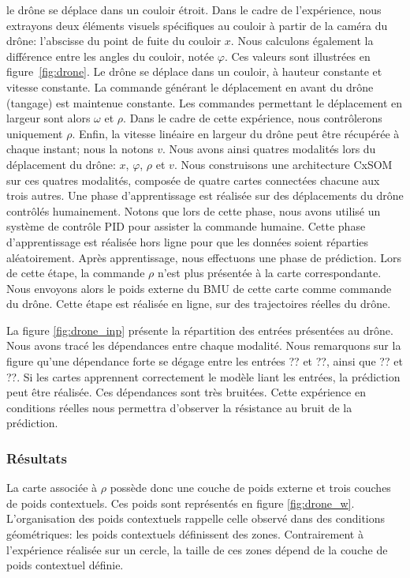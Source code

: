 \documentclass[../main]{subfiles}
\begin{document}
le drône se déplace dans un couloir étroit.
Dans le cadre de l'expérience, nous extrayons deux éléments visuels spécifiques au couloir à partir de la caméra du drône: l'abscisse du point de fuite du couloir $x$. Nous calculons également la différence entre les angles du couloir, notée $\varphi$. Ces valeurs sont illustrées en figure~\ref{fig:drone}.
Le drône se déplace dans un couloir, à hauteur constante et vitesse constante.
La commande générant le déplacement en avant du drône (tangage) est maintenue constante. Les commandes permettant le déplacement en largeur sont alors $\omega$ et $\rho$. Dans le cadre de cette expérience, nous contrôlerons uniquement $\rho$.
Enfin, la vitesse linéaire en largeur du drône peut être récupérée à chaque instant; nous la notons $v$.
Nous avons ainsi quatres modalités lors du déplacement du drône: $x$, $\varphi$, $\rho$ et $v$.
Nous construisons une architecture CxSOM sur ces quatres modalités, composée de quatre cartes connectées chacune aux trois autres.
Une phase d'apprentissage est réalisée sur des déplacements du drône contrôlés humainement. Notons que lors de cette phase, nous avons utilisé un système de contrôle PID pour assister la commande humaine. Cette phase d'apprentissage est réalisée hors ligne pour que les données soient réparties aléatoirement.
Après apprentissage, nous effectuons une phase de prédiction. Lors de cette étape, la commande $\rho$ n'est plus présentée à la carte correspondante. Nous envoyons alors le poids externe du BMU de cette carte comme commande du drône. Cette étape est réalisée en ligne, sur des trajectoires réelles du drône.

La figure \ref{fig:drone_inp} présente la répartition des entrées présentées au drône. Nous avons tracé les dépendances entre chaque modalité. Nous remarquons sur la figure qu'une dépendance forte se dégage entre les entrées ?? et ??, ainsi que ?? et ??. Si les cartes apprennent correctement le modèle liant les entrées, la prédiction peut être réalisée.
Ces dépendances sont très bruitées. Cette expérience en conditions réelles nous permettra d'observer la résistance au bruit de la prédiction.


\subsubsection{Résultats}
La carte associée à $\rho$ possède donc une couche de poids externe et trois couches de poids contextuels. Ces poids sont représentés en figure \ref{fig:drone_w}. L'organisation des poids contextuels rappelle celle observé dans des conditions géométriques: les poids contextuels définissent des zones. Contrairement à l'expérience réalisée sur un cercle, la taille de ces zones dépend de la couche de poids contextuel définie. 
\end{document}
